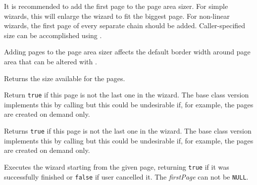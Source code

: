 It is recommended to add the first page to the page area sizer. For simple wizards,
this will enlarge the wizard to fit the biggest page. For non-linear wizards,
the first page of every separate chain should be added. Caller-specified size
can be accomplished using .

Adding pages to the page area sizer affects the default border width around page
area that can be altered with .


\label{wxwizardgetpagesize}


Returns the size available for the pages.


\label{wxwizardhasnextpage}


Return {\tt true} if this page is not the last one in the wizard. The base
class version implements this by calling 
 but this could be undesirable if,
for example, the pages are created on demand only.




\label{wxwizardhasprevpage}


Returns {\tt true} if this page is not the last one in the wizard. The base
class version implements this by calling 
 but this could be undesirable if,
for example, the pages are created on demand only.




\label{wxwizardrunwizard}


Executes the wizard starting from the given page, returning {\tt true} if it was
successfully finished or {\tt false} if user cancelled it. The {\it firstPage} 
can not be {\tt NULL}.


\label{wxwizardsetpagesize}

